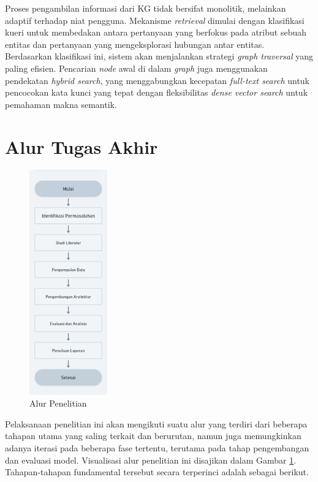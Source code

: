 Proses pengambilan informasi dari KG tidak bersifat monolitik, melainkan adaptif terhadap niat pengguna.
Mekanisme \textit{retrieval} dimulai dengan klasifikasi kueri untuk membedakan antara pertanyaan yang berfokus pada atribut sebuah entitas dan pertanyaan yang mengeksplorasi hubungan antar entitas.
Berdasarkan klasifikasi ini, sistem akan menjalankan strategi \textit{graph traversal} yang paling efisien.
Pencarian \textit{node} awal di dalam \textit{graph} juga menggunakan pendekatan \textit{hybrid search}, yang menggabungkan kecepatan \textit{full-text search} untuk pencocokan kata kunci yang tepat dengan fleksibilitas \textit{dense vector search} untuk pemahaman makna semantik.

\section{Alur Tugas Akhir}
\begin{figure}[H]
	\centering
	\includegraphics[width=0.3\textwidth]{images/alur-penelitian.png}
	\caption{Alur Penelitian}
	\label{fig:research-flow}
\end{figure}

Pelaksanaan penelitian ini akan mengikuti suatu alur yang terdiri dari beberapa tahapan utama yang saling terkait dan berurutan,
namun juga memungkinkan adanya iterasi pada beberapa fase tertentu, terutama pada tahap pengembangan dan evaluasi model.
Visualisasi alur penelitian ini disajikan dalam Gambar \ref{fig:research-flow}.
Tahapan-tahapan fundamental tersebut secara terperinci adalah sebagai berikut.


